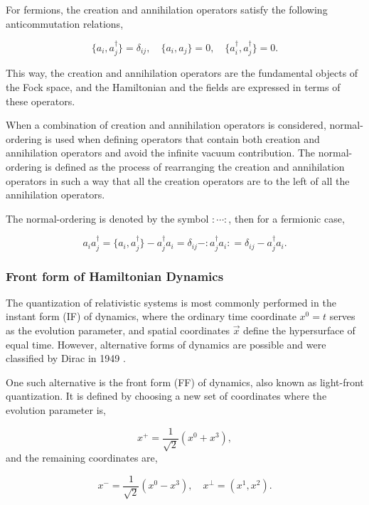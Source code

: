 \documentclass[11pt,a4paper,twoside,pdf]{article}
\numberwithin{equation}{section}
\begin{document}
For fermions, the creation and annihilation operators satisfy the following anticommutation
relations,

\begin{equation}
    \{a_i, a_j^\dagger\} = \delta_{ij}, \quad
    \{a_i, a_j\} = 0, \quad
    \{a_i^\dagger, a_j^\dagger\} = 0.
\end{equation}

This way, the creation and annihilation operators are the fundamental objects of the
Fock space, and the Hamiltonian and the fields are expressed in terms of these operators.


When a combination of creation and annihilation operators is considered, normal-ordering is
used when defining operators that contain both creation and annihilation operators
and avoid the infinite vacuum contribution. The normal-ordering is defined as the 
process of rearranging the creation and annihilation operators in such a way that 
all the creation operators are to the left of all the annihilation operators.

The normal-ordering is denoted by the symbol $:\cdots:$, then for a fermionic case, 

\begin{equation}
    a_i a_j^\dagger =  \{a_i, a_j^\dagger\} -  a_j^\dagger a_i = 
    \delta_{ij} - :a_j^\dagger a_i: = \delta_{ij} - a_j^\dagger a_i.
\end{equation}

\subsubsection{Front form of Hamiltonian Dynamics}
The quantization of relativistic systems is most commonly performed in the instant form 
(IF) of dynamics, where the ordinary time coordinate \( x^0 = t \) serves as the evolution 
parameter, and spatial coordinates \( \vec{x} \) define the hypersurface of equal time. 
However, alternative forms of dynamics are possible and were classified by Dirac in 
1949 \cite{dirac_front_forms_1949}.

One such alternative is the front form (FF) of dynamics, also known as light-front 
quantization. It is defined by choosing a new set of coordinates where the evolution 
parameter is,

\begin{equation}
    x^+ = \frac{1}{\sqrt{2}} (x^0 + x^3),
\end{equation}
and the remaining coordinates are,

\begin{equation}
    x^- = \frac{1}{\sqrt{2}} (x^0 - x^3), \quad x^\perp = (x^1, x^2).
\end{equation}
\end{document}
